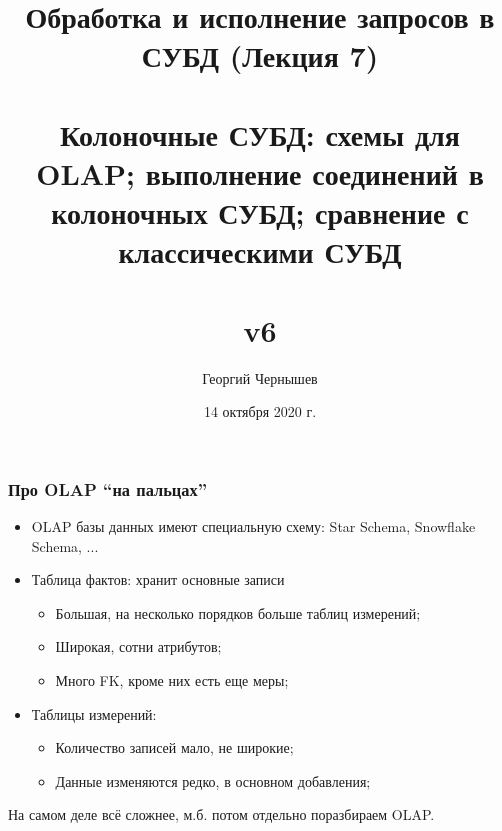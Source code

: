 \documentclass{beamer}
\title[Обработка и исполнение запросов: лекция 7]{Обработка и исполнение запросов в СУБД (Лекция 7) \\~\\ Колоночные СУБД: схемы для OLAP; выполнение соединений в колоночных СУБД; сравнение с классическими СУБД\\~\\ v6} %
\author{Георгий Чернышев} %
\institute[ВШЭ] %
{
Высшая Школа Экономики \\ %
\medskip
\textit{chernishev@gmail.com} %
}
\date{14 октября 2020 г.}
\begin{document}
\begin{frame}
\titlepage %
\end{frame}

\begin{frame}
\frametitle{Про OLAP ``на пальцах''}


\begin{itemize}
  \setlength\itemsep{1em}
  \item OLAP базы данных имеют специальную схему: Star Schema, Snowflake Schema, ...
  \item Таблица фактов: хранит основные записи
  \begin{itemize}
    \item Большая, на несколько порядков больше таблиц измерений;
    \item Широкая, сотни атрибутов;
    \item Много FK, кроме них есть еще меры;
  \end{itemize}
  \item Таблицы измерений: 
  \begin{itemize}
    \item Количество записей мало, не широкие;
    \item Данные изменяются редко, в основном добавления;
  \end{itemize}
  
\end{itemize}

На самом деле всё сложнее, м.б. потом отдельно поразбираем OLAP.

\end{frame}
\end{document}
